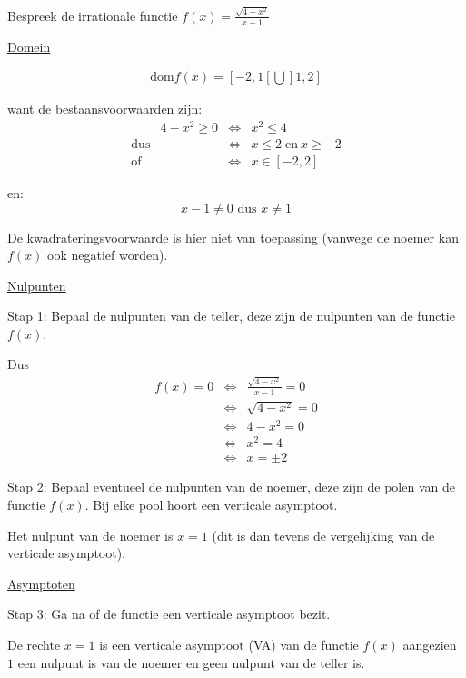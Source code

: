 \begin{voorbeeld}
	Bespreek de irrationale functie $f(x)=\frac{\sqrt{4-x^{2}}}{x-1}$

\underline{Domein}

\begin{eqnarray}
\textrm{dom}f(x)=[-2,1[\bigcup]1,2]
\end{eqnarray}

want de bestaansvoorwaarden zijn:  
\begin{equation*}
\begin{array}{ccclcc}
& 4-x^{2}\geq0 & \iff & x^{2}\leq4\\
\textrm{dus} & & \iff & x\leq2\;\textrm{en}\:x\geq-2\\
\textrm{of} & & \iff & x\in[-2,2]
\end{array}
\end{equation*}

en:
\begin{equation*}
x-1\neq0 \textrm{ dus } x\neq1
\end{equation*}

De kwadrateringsvoorwaarde is hier niet van toepassing (vanwege de
noemer kan $f(x)$ ook negatief worden).

\underline{Nulpunten}

Stap 1: Bepaal de nulpunten van de teller, deze zijn de nulpunten
van de functie $f(x)$.

Dus 
\begin{equation*}
\begin{array}{ccc}
f(x)=0 & \iff & \frac{\sqrt{4-x^{2}}}{x-1} = 0\\
& \iff & \sqrt{4-x^{2}} = 0\\
& \iff & 4-x^{2} = 0\\
& \iff & x^{2} = 4\\
& \iff & x = \pm2
\end{array}
\end{equation*}

Stap 2: Bepaal eventueel de nulpunten van de noemer, deze zijn de
polen van de functie $f(x)$. Bij elke pool hoort een verticale asymptoot.

Het nulpunt van de noemer is $x=1$ (dit is dan tevens de vergelijking
van de verticale asymptoot).

\underline{Asymptoten}

Stap 3: Ga na of de functie een verticale asymptoot bezit. 

De rechte $x=1$ is een verticale asymptoot (VA) van de functie $f(x)$
aangezien $1$ een nulpunt is van de noemer en geen nulpunt van de
teller is.


\end{voorbeeld}
